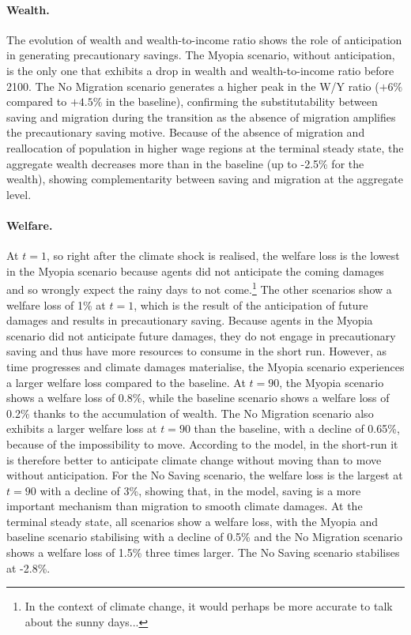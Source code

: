 \documentclass[12pt, a4paper]{article}
\begin{document}
\paragraph{Wealth.} The evolution of wealth and wealth-to-income ratio shows the role of anticipation in generating precautionary savings. The Myopia scenario, without anticipation, is the only one that exhibits a drop in wealth and wealth-to-income ratio before 2100. The No Migration scenario generates a higher peak in the W/Y ratio ($+6\%$ compared to $+4.5\%$ in the baseline), confirming the substitutability between saving and migration during the transition as the absence of migration amplifies the precautionary saving motive. Because of the absence of migration and reallocation of population in higher wage regions at the terminal steady state, the aggregate wealth decreases more than in the baseline (up to -2.5\% for the wealth), showing complementarity between saving and migration at the aggregate level.

\paragraph{Welfare.} At $t = 1$, so right after the climate shock is realised, the welfare loss is the lowest in the Myopia scenario because agents did not anticipate the coming damages and so wrongly expect the rainy days to not come.\footnote{In the context of climate change, it would perhaps be more accurate to talk about the sunny days...} The other scenarios show a welfare loss of 1\% at $t = 1$, which is the result of the anticipation of future damages and results in precautionary saving. Because agents in the Myopia scenario did not anticipate future damages, they do not engage in precautionary saving and thus have more resources to consume in the short run. However, as time progresses and climate damages materialise, the Myopia scenario experiences a larger welfare loss compared to the baseline. At $t = 90$, the Myopia scenario shows a welfare loss of 0.8\%, while the baseline scenario shows a welfare loss of 0.2\% thanks to the accumulation of wealth. The No Migration scenario also exhibits a larger welfare loss at $t = 90$ than the baseline, with a decline of 0.65\%, because of the impossibility to move. According to the model, in the short-run it is therefore better to anticipate climate change without moving than to move without anticipation. For the No Saving scenario, the welfare loss is the largest at $t = 90$ with a decline of 3\%, showing that, in the model, saving is a more important mechanism than migration to smooth climate damages. At the terminal steady state, all scenarios show a welfare loss, with the Myopia and baseline scenario stabilising with a decline of 0.5\% and the No Migration scenario shows a welfare loss of 1.5\% three times larger. The No Saving scenario stabilises at -2.8\%. 
\end{document}
